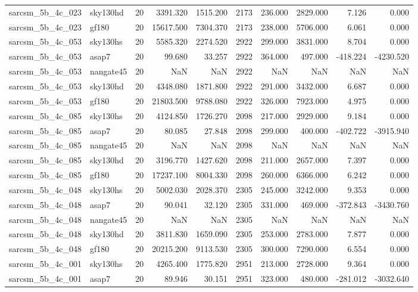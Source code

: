 \begin{longtable}{llrrrrrrrr}
sarcsm\_5b\_4c\_023 & sky130hd & 20 & 3391.320 & 1515.200 & 2173 & 236.000 & 2829.000 & 7.126 & 0.000 \\
sarcsm\_5b\_4c\_023 & gf180 & 20 & 15617.500 & 7304.370 & 2173 & 238.000 & 5706.000 & 6.061 & 0.000 \\
sarcsm\_5b\_4c\_053 & sky130hs & 20 & 5585.320 & 2274.520 & 2922 & 299.000 & 3831.000 & 8.704 & 0.000 \\
sarcsm\_5b\_4c\_053 & asap7 & 20 & 99.680 & 33.257 & 2922 & 364.000 & 497.000 & -418.224 & -4230.520 \\
sarcsm\_5b\_4c\_053 & nangate45 & 20 & NaN & NaN & 2922 & NaN & NaN & NaN & NaN \\
sarcsm\_5b\_4c\_053 & sky130hd & 20 & 4348.080 & 1871.800 & 2922 & 291.000 & 3432.000 & 6.687 & 0.000 \\
sarcsm\_5b\_4c\_053 & gf180 & 20 & 21803.500 & 9788.080 & 2922 & 326.000 & 7923.000 & 4.975 & 0.000 \\
sarcsm\_5b\_4c\_085 & sky130hs & 20 & 4124.850 & 1726.270 & 2098 & 217.000 & 2929.000 & 9.184 & 0.000 \\
sarcsm\_5b\_4c\_085 & asap7 & 20 & 80.085 & 27.848 & 2098 & 299.000 & 400.000 & -402.722 & -3915.940 \\
sarcsm\_5b\_4c\_085 & nangate45 & 20 & NaN & NaN & 2098 & NaN & NaN & NaN & NaN \\
sarcsm\_5b\_4c\_085 & sky130hd & 20 & 3196.770 & 1427.620 & 2098 & 211.000 & 2657.000 & 7.397 & 0.000 \\
sarcsm\_5b\_4c\_085 & gf180 & 20 & 17237.100 & 8004.330 & 2098 & 260.000 & 6366.000 & 6.242 & 0.000 \\
sarcsm\_5b\_4c\_048 & sky130hs & 20 & 5002.030 & 2028.370 & 2305 & 245.000 & 3242.000 & 9.353 & 0.000 \\
sarcsm\_5b\_4c\_048 & asap7 & 20 & 90.041 & 32.120 & 2305 & 331.000 & 469.000 & -372.843 & -3430.760 \\
sarcsm\_5b\_4c\_048 & nangate45 & 20 & NaN & NaN & 2305 & NaN & NaN & NaN & NaN \\
sarcsm\_5b\_4c\_048 & sky130hd & 20 & 3811.830 & 1659.090 & 2305 & 253.000 & 2783.000 & 7.877 & 0.000 \\
sarcsm\_5b\_4c\_048 & gf180 & 20 & 20215.200 & 9113.530 & 2305 & 300.000 & 7290.000 & 6.554 & 0.000 \\
sarcsm\_5b\_4c\_001 & sky130hs & 20 & 4265.400 & 1775.820 & 2951 & 213.000 & 2728.000 & 9.364 & 0.000 \\
sarcsm\_5b\_4c\_001 & asap7 & 20 & 89.946 & 30.151 & 2951 & 323.000 & 480.000 & -281.012 & -3032.640 \\

\end{longtable}
